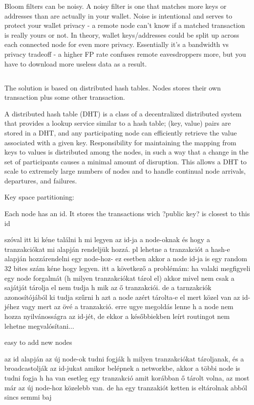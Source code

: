 \documentclass[a4paper,12pt]{article}
\begin{document}
Bloom filters can be noisy. A noisy filter is one that matches more keys or addresses than are actually in your wallet. Noise is intentional and serves to protect your wallet privacy - a remote node can't know if a matched transaction is really yours or not. In theory, wallet keys/addresses could be split up across each connected node for even more privacy. Essentially it's a bandwidth vs privacy tradeoff - a higher FP rate confuses remote eavesdroppers more, but you have to download more useless data as a result.



\subsection{}
The solution is based on distributed hash tables. Nodes stores their own transaction plus some other transaction.

A distributed hash table (DHT) is a class of a decentralized distributed system that provides a lookup service similar to a hash table; (key, value) pairs are stored in a DHT, and any participating node can efficiently retrieve the value associated with a given key. Responsibility for maintaining the mapping from keys to values is distributed among the nodes, in such a way that a change in the set of participants causes a minimal amount of disruption. This allows a DHT to scale to extremely large numbers of nodes and to handle continual node arrivals, departures, and failures.

Key space partitioning: 

Each node has an id. It stores the transactions wich ?public key? is closest to this id

szóval itt ki kéne találni h mi legyen az id-ja a node-oknak és hogy a tranzakciókat mi alapján rendeljük hozzá. pl lehetne a tranzakciót a hash-e alapján hozzárendelni egy node-hoz- ez esetben akkor a node id-ja is egy random 32 bites szám kéne hogy legyen. itt a következő a problémám: ha valaki megfigyeli egy node forgalmát (h milyen tranzakciókat tárol el) akkor mivel nem csak a sajátját tárolja el nem tudja h mik az ő tranzakciói. de a tarnzakciók azonosítójából ki tudja szűrni h azt a node azért tárolta-e el mert közel van az id-jéhez vagy mert az övé a tranzakció. erre ugye megoldás lenne h a node nem hozza nyilvánosságra az id-jét, de ekkor a későbbiekben leírt routingot nem lehetne megvalósítani... 

easy to add new nodes

az id alapján az új node-ok tudni fogják h milyen tranzakciókat tároljanak, és a broadcastolják az id-jukat amikor belépnek a networkbe, akkor a többi node is tudni fogja h ha van esetleg egy tranzakció amit korábban ő tárolt volna, az most már az új node-hoz közelebb van. de ha egy tranzakiót ketten is eltárolnak abból sincs semmi baj
\end{document}
